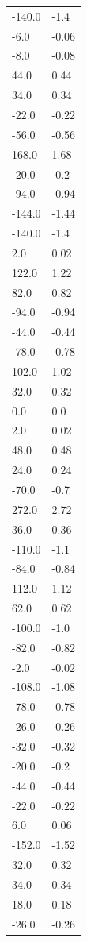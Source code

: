 \begin{longtable}{ll}
-140.0 & -1.4 \\
-6.0 & -0.06 \\
-8.0 & -0.08 \\
44.0 & 0.44 \\
34.0 & 0.34 \\
-22.0 & -0.22 \\
-56.0 & -0.56 \\
168.0 & 1.68 \\
-20.0 & -0.2 \\
-94.0 & -0.94 \\
-144.0 & -1.44 \\
-140.0 & -1.4 \\
2.0 & 0.02 \\
122.0 & 1.22 \\
82.0 & 0.82 \\
-94.0 & -0.94 \\
-44.0 & -0.44 \\
-78.0 & -0.78 \\
102.0 & 1.02 \\
32.0 & 0.32 \\
0.0 & 0.0 \\
2.0 & 0.02 \\
48.0 & 0.48 \\
24.0 & 0.24 \\
-70.0 & -0.7 \\
272.0 & 2.72 \\
36.0 & 0.36 \\
-110.0 & -1.1 \\
-84.0 & -0.84 \\
112.0 & 1.12 \\
62.0 & 0.62 \\
-100.0 & -1.0 \\
-82.0 & -0.82 \\
-2.0 & -0.02 \\
-108.0 & -1.08 \\
-78.0 & -0.78 \\
-26.0 & -0.26 \\
-32.0 & -0.32 \\
-20.0 & -0.2 \\
-44.0 & -0.44 \\
-22.0 & -0.22 \\
6.0 & 0.06 \\
-152.0 & -1.52 \\
32.0 & 0.32 \\
34.0 & 0.34 \\
18.0 & 0.18 \\
-26.0 & -0.26 \\

\end{longtable}

